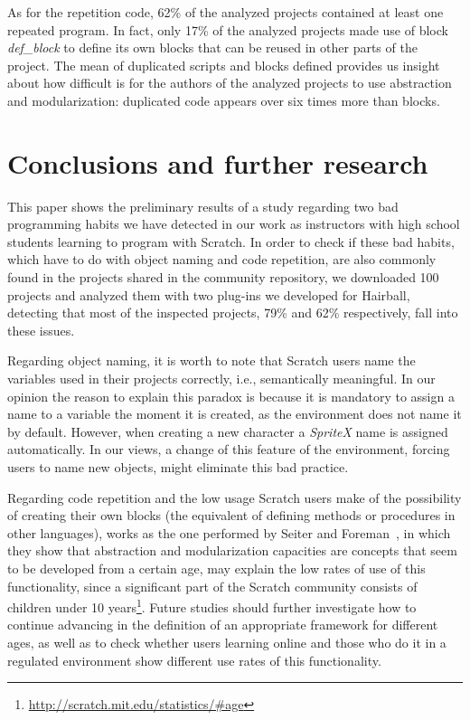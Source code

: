 \documentclass[conference]{format/IEEEtran}
\begin{document}
As for the repetition code, 62\% of the analyzed projects contained at least one repeated program. In fact, only 17\% of the analyzed projects made use of block \textit{def\_block} to define its own blocks that can be reused in other parts of the project. The mean of duplicated scripts and blocks defined provides us insight about how difficult is for the authors of the analyzed projects to use abstraction and modularization: duplicated code appears over six times more than blocks.

\section{Conclusions and further research}
\label{sec:conclusions}


This paper shows the preliminary results of a study regarding two bad programming habits we have detected in our work as instructors with high school students learning to program with Scratch. In order to check if these bad habits, which have to do with object naming and code repetition, are also commonly found in the projects shared in the community repository, we downloaded 100 projects and analyzed them with two plug-ins we developed for Hairball, detecting that most of the inspected projects, 79\% and 62\%  respectively, fall into these issues.

Regarding object naming, it is worth to note that Scratch users name the variables used in their projects correctly, i.e., semantically meaningful. In our opinion the reason to explain this paradox is because it is mandatory to assign a name to a variable the moment it is created, as the environment does not name it by default. However, when creating a new character a  \textit{SpriteX} name is assigned automatically. In our views, a change of this feature of the environment, forcing users to name new objects, might eliminate this bad practice.

Regarding code repetition and the low usage Scratch users make of the possibility of creating their own blocks (the equivalent of defining methods or procedures in other languages), works as the one performed by Seiter and Foreman~\cite {seiter2013modeling}, in which they show that abstraction and modularization capacities are concepts that seem to be developed from a certain age, may explain the low rates of use of this functionality, since a significant part of the Scratch community consists of children under 10 years\footnote{\url{http://scratch.mit.edu/statistics/#age}}. Future studies should further investigate how to continue advancing in the definition of an appropriate framework for different ages, as well as to check whether users learning online and those who do it in a regulated environment show different use rates of this functionality.
\end{document}
